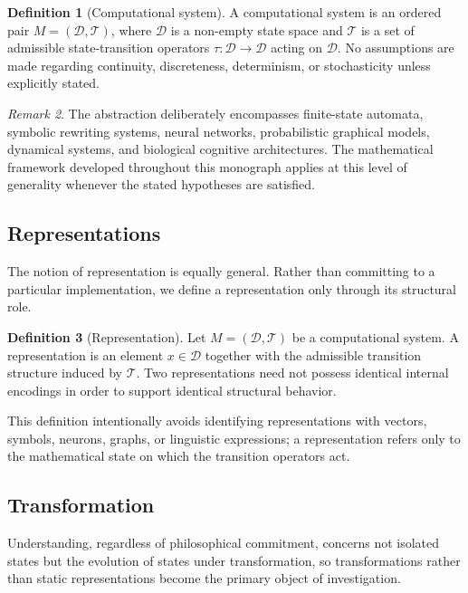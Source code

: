\documentclass[11pt,twoside,openright]{book}
\numberwithin{equation}{chapter}
\theoremstyle{definition}
\newtheorem{definition}{Definition}[chapter]
\theoremstyle{plain}
\theoremstyle{remark}
\newtheorem{remark}[definition]{Remark}
\theoremstyle{definition}
\newcommand{\Domain}{\mathcal{D}}
\newcommand{\Trans}{\mathcal{T}}
\begin{document}
\begin{definition}[Computational system]
A computational system is an ordered pair $M=(\Domain,\Trans)$, where
$\Domain$ is a non-empty state space and $\Trans$ is a set of admissible
state-transition operators $\tau:\Domain\to\Domain$ acting on $\Domain$.
No assumptions are made regarding continuity, discreteness, determinism,
or stochasticity unless explicitly stated.
\end{definition}

\begin{remark}
The abstraction deliberately encompasses finite-state automata, symbolic
rewriting systems, neural networks, probabilistic graphical models,
dynamical systems, and biological cognitive architectures. The
mathematical framework developed throughout this monograph applies at
this level of generality whenever the stated hypotheses are satisfied.
\end{remark}

\subsection{Representations}

The notion of representation is equally general. Rather than committing
to a particular implementation, we define a representation only through
its structural role.

\begin{definition}[Representation]
Let $M=(\Domain,\Trans)$ be a computational system. A representation is
an element $x\in\Domain$ together with the admissible transition
structure induced by $\Trans$. Two representations need not possess
identical internal encodings in order to support identical structural
behavior.
\end{definition}

This definition intentionally avoids identifying representations with
vectors, symbols, neurons, graphs, or linguistic expressions; a
representation refers only to the mathematical state on which the
transition operators act.

\subsection{Transformation}

Understanding, regardless of philosophical commitment, concerns not
isolated states but the evolution of states under transformation, so
transformations rather than static representations become the primary
object of investigation.
\end{document}
